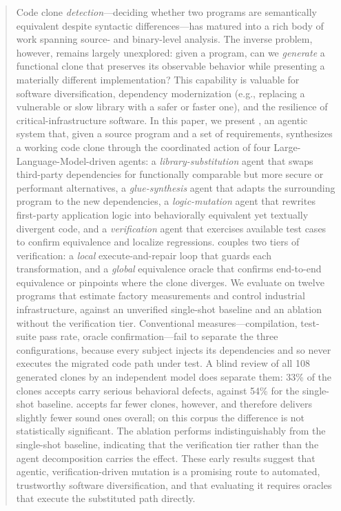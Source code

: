 %

\begin{abstract}
Code clone \emph{detection}---deciding whether two programs are semantically equivalent despite syntactic differences---has matured into a rich body of work spanning source- and binary-level analysis. The inverse problem, however, remains largely unexplored: given a program, can we \emph{generate} a functional clone that preserves its observable behavior while presenting a materially different implementation? This capability is valuable for software diversification, dependency modernization (e.g., replacing a vulnerable or slow library with a safer or faster one), and the resilience of critical-infrastructure software. In this paper, we present \sys, an agentic system that, given a source program and a set of requirements, synthesizes a working code clone through the coordinated action of four Large-Language-Model-driven agents: a \emph{library-substitution} agent that swaps third-party dependencies for functionally comparable but more secure or performant alternatives, a \emph{glue-synthesis} agent that adapts the surrounding program to the new dependencies, a \emph{logic-mutation} agent that rewrites first-party application logic into behaviorally equivalent yet textually divergent code, and a \emph{verification} agent that exercises available test cases to confirm equivalence and localize regressions. \sys couples two tiers of verification: a \emph{local} execute-and-repair loop that guards each transformation, and a \emph{global} equivalence oracle that confirms end-to-end equivalence or pinpoints where the clone diverges. We evaluate \sys on twelve programs that estimate factory measurements and control industrial infrastructure, against an unverified single-shot baseline and an ablation without the verification tier. Conventional measures---compilation, test-suite pass rate, oracle confirmation---fail to separate the three configurations, because every subject injects its dependencies and so never executes the migrated code path under test. A blind review of all 108 generated clones by an independent model does separate them: 33\% of the clones \sys accepts carry serious behavioral defects, against 54\% for the single-shot baseline. \sys accepts far fewer clones, however, and therefore delivers slightly fewer sound ones overall; on this corpus the difference is not statistically significant. The ablation performs indistinguishably from the single-shot baseline, indicating that the verification tier rather than the agent decomposition carries the effect. These early results suggest that agentic, verification-driven mutation is a promising route to automated, trustworthy software diversification, and that evaluating it requires oracles that execute the substituted path directly.
\end{abstract}
